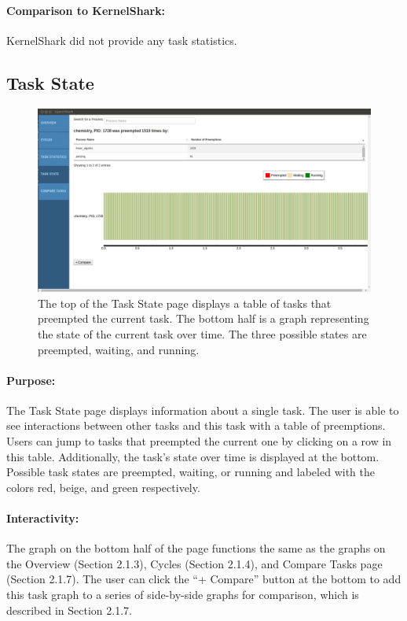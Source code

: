 \documentclass{hmcclinic}
\begin{document}
\paragraph{Comparison to KernelShark:} KernelShark did not provide any task statistics. 


  \subsection{Task State}

  \begin{figure}[H]
  \includegraphics[scale=0.25]{task-state-page.png}
  \caption{The top of the Task State page displays a table of tasks
  that preempted the current task. The bottom half is a graph representing the
state of the current task over time. The three possible states are preempted,
waiting, and running.}
\end{figure}

\paragraph{Purpose:}
    The Task State page displays information about a single task. The user is
    able to see interactions between other tasks and this task with a table of
    preemptions. Users can jump to tasks that preempted the current one by
    clicking on a row in this table. Additionally, the task's state over time
    is displayed at the bottom. Possible task states are preempted, waiting, or
    running and labeled with the colors red, beige, and green respectively. 

\paragraph{Interactivity:}
    The graph on the bottom half of the page functions the same as the graphs on
    the Overview (Section 2.1.3), Cycles (Section 2.1.4), and Compare Tasks page
    (Section 2.1.7). The user can click the ``+ Compare'' button at the bottom
    to add this task graph to a series of side-by-side graphs for comparison,
    which is described in Section 2.1.7.
    
\end{document}
